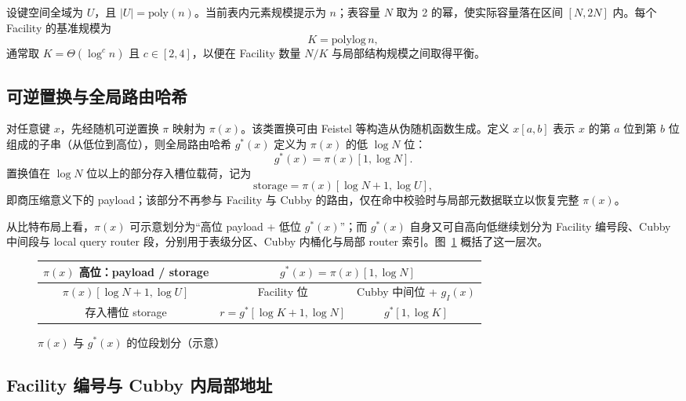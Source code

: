 设键空间全域为 \(U\)，且 \(|U|=\mathrm{poly}(n)\)。当前表内元素规模提示为 \(n\)；表容量 \(N\) 取为 2 的幂，使实际容量落在区间 \([N,2N]\) 内。每个 Facility 的基准规模为
\[
  K=\mathrm{polylog}\,n,
\]
通常取 \(K=\Theta(\log^c n)\) 且 \(c\in[2,4]\)，以便在 Facility 数量 \(N/K\) 与局部结构规模之间取得平衡\cite{bender2022otsh,bender2024sosa}。

\subsection{可逆置换与全局路由哈希}

对任意键 \(x\)，先经随机可逆置换 \(\pi\) 映射为 \(\pi(x)\)。该类置换可由 Feistel 等构造从伪随机函数生成\cite{luby1988,carter1979,thorup2012tabulation}。定义 \(x[a, b]\) 表示 \(x\) 的第 \(a\) 位到第 \(b\) 位组成的子串（从低位到高位），则全局路由哈希 \(g^\ast(x)\) 定义为 \(\pi(x)\) 的低 \(\log N\) 位：
\[
  g^\ast(x)=\pi(x)[1,\log N].
\]
置换值在 \(\log N\) 位以上的部分存入槽位载荷，记为
\[
  \mathrm{storage}=\pi(x)[\log N+1,\log U],
\]
即商压缩意义下的 payload；该部分不再参与 Facility 与 Cubby 的路由，仅在命中校验时与局部元数据联立以恢复完整 \(\pi(x)\)。

从比特布局上看，\(\pi(x)\) 可示意划分为“高位 payload + 低位 \(g^\ast(x)\)”；而 \(g^\ast(x)\) 自身又可自高向低继续划分为 Facility 编号段、Cubby 中间段与 local query router 段，分别用于表级分区、Cubby 内桶化与局部 router 索引。图~\ref{fig:gx-layout} 概括了这一层次。

\begin{figure}[htbp]
  \centering
  \setlength{\tabcolsep}{4pt}
  \small
  \begin{tabular}{|c|c|c|} 
    \hline
    \multicolumn{1}{|c|}{$\pi(x)$ 高位：payload / storage} &
    \multicolumn{2}{c|}{$g^\ast(x)=\pi(x)[1,\log N]$} \\
    \hline
    $\pi(x)[\log N+1,\log U]$ & Facility 位 & Cubby 中间位 + $g_I(x)$ \\
    \hline
    存入槽位 storage & $r=g^\ast[\log K+1,\log N]$ & $g^\ast[1,\log K]$ \\
    \hline
  \end{tabular}
  \caption{$\pi(x)$ 与 $g^\ast(x)$ 的位段划分（示意）}
  \label{fig:gx-layout}
\end{figure}

\subsection{Facility 编号与 Cubby 内局部地址}

